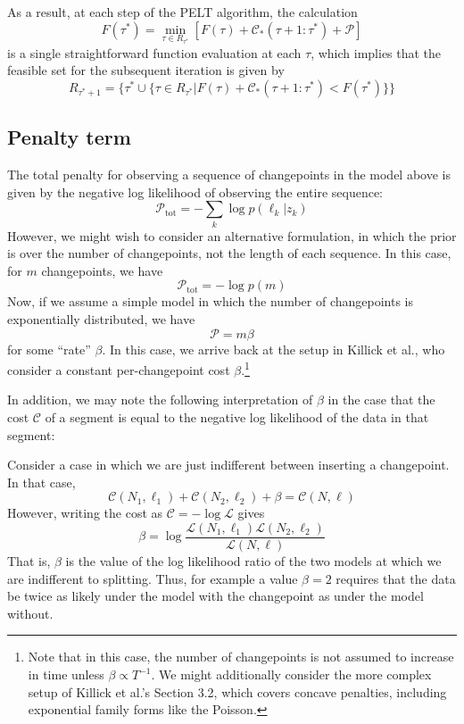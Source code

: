 \documentclass[11pt]{article}
\begin{document}
As a result, at each step of the PELT algorithm, the calculation
\begin{equation}
    F(\tau^*) = \min_{\tau \in R_{\tau^*}} [F(\tau) + \mathcal{C}_*(\tau + 1:\tau^*) + \mathcal{P}]
\end{equation}
is a single straightforward function evaluation at each $\tau$, which implies that the feasible set for the subsequent iteration is given by
\begin{equation}
    R_{\tau^* + 1} = \lbrace \tau^* \cup
    \lbrace
    \tau \in R_{\tau^*} \vert F(\tau) + \mathcal{C}_*(\tau + 1:\tau^*) <
    F(\tau^*)
    \rbrace \rbrace
\end{equation}

\subsection{Penalty term}
The total penalty for observing a sequence of changepoints in the model above is given by the negative log likelihood of observing the entire sequence:
\begin{equation}
    \mathcal{P}_\mathrm{tot} = -\sum_k \log p(\ell_k|z_k)
\end{equation}
However, we might wish to consider an alternative formulation, in which the prior is over the number of changepoints, not the length of each sequence. In this case, for $m$ changepoints, we have
\begin{equation}
    \mathcal{P}_\mathrm{tot} = -\log p(m)
\end{equation}
Now, if we assume a simple model in which the number of changepoints is exponentially distributed, we have
\begin{equation}
    \mathcal{P} = m\beta
\end{equation}
for some ``rate'' $\beta$. In this case, we arrive back at the setup in Killick et al., who consider a constant per-changepoint cost $\beta$.\footnote{Note that in this case, the number of changepoints is not assumed to increase in time unless $\beta \propto T^{-1}$. We might additionally consider the more complex setup of Killick et al.'s Section 3.2, which covers concave penalties, including exponential family forms like the Poisson.}

In addition, we may note the following interpretation of $\beta$ in the case that the cost $\mathcal{C}$ of a segment is equal to the negative log likelihood of the data in that segment:

Consider a case in which we are just indifferent between inserting a changepoint. In that case,
\begin{equation}
    \mathcal{C}(N_1, \ell_1) + \mathcal{C}(N_2, \ell_2) + \beta = \mathcal{C}(N, \ell)
\end{equation}
However, writing the cost as $\mathcal{C} = -\log \mathcal{L}$ gives
\begin{equation}
    \beta = \log \frac{\mathcal{L}(N_1, \ell_1)\mathcal{L}(N_2, \ell_2)}{\mathcal{L}(N, \ell)}
\end{equation}
That is, $\beta$ is the value of the log likelihood ratio of the two models at which we are indifferent to splitting. Thus, for example a value $\beta = 2$ requires that the data be twice as likely under the model with the changepoint as under the model without.
\end{document}
